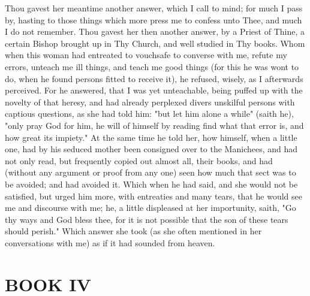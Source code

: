 \documentclass[b5paper,openright,12pt,twoside]{book}
\begin{document}
Thou gavest her meantime another answer, which I call to mind; for much
I pass by, hasting to those things which more press me to confess unto
Thee, and much I do not remember. Thou gavest her then another answer,
by a Priest of Thine, a certain Bishop brought up in Thy Church,
and well studied in Thy books. Whom when this woman had entreated to
vouchsafe to converse with me, refute my errors, unteach me ill things,
and teach me good things (for this he was wont to do, when he found
persons fitted to receive it), he refused, wisely, as I afterwards
perceived. For he answered, that I was yet unteachable, being puffed
up with the novelty of that heresy, and had already perplexed divers
unskilful persons with captious questions, as she had told him: "but
let him alone a while" (saith he), "only pray God for him, he will of
himself by reading find what that error is, and how great its impiety."
At the same time he told her, how himself, when a little one, had by his
seduced mother been consigned over to the Manichees, and had not
only read, but frequently copied out almost all, their books, and had
(without any argument or proof from any one) seen how much that sect was
to be avoided; and had avoided it. Which when he had said, and she would
not be satisfied, but urged him more, with entreaties and many tears,
that he would see me and discourse with me; he, a little displeased at
her importunity, saith, "Go thy ways and God bless thee, for it is not
possible that the son of these tears should perish." Which answer she
took (as she often mentioned in her conversations with me) as if it had
sounded from heaven.




\chapter{BOOK IV}
\end{document}

